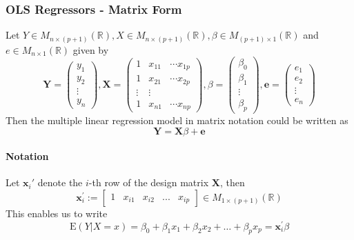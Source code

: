 \documentclass[10pt]{article}
\newcommand{\bx}{\mathbf{x}}
\newcommand{\R}{\mathbb{R}}
\newcommand{\mat}[2]{M_{#1 \times #2}(\R)}
\begin{document}
\subsubsection{OLS Regressors - Matrix Form}
Let $Y \in \mat{n}{(p+1)}, X\in \mat{n}{(p+1)}, \beta\in \mat{(p+1)}{1}$ and $e\in \mat{n}{1}$ given by
\begin{equation*}
    \mathbf{Y}=\left(\begin{array}{c}{y_{1}} \\ {y_{2}} \\ {\vdots} \\ {y_{n}}\end{array}\right), \mathbf{X}=\left(\begin{array}{ccc}{1} & {x_{11}} & {\cdots x_{1 p}} \\ {1} & {x_{21}} & {\cdots x_{2 p}} \\ {\vdots} & {\vdots} & {} \\ {1} & {x_{n 1}} & {\cdots x_{n p}}\end{array}\right), \beta=\left(\begin{array}{c}{\beta_{0}} \\ {\beta_{1}} \\ {\vdots} \\ {\beta_{p}}\end{array}\right), \mathbf{e}=\left(\begin{array}{c}{e_{1}} \\ {e_{2}} \\ {\vdots} \\ {e_{n}}\end{array}\right)
\end{equation*}
Then the multiple linear regression model in matrix notation could be written as
\begin{equation*}
    \mathbf{Y}=\mathbf{X} \beta+\mathbf{e}
\end{equation*}
\paragraph{Notation} Let $\bx_i'$ denote the $i$-th row of the design matrix $\mathbf{X}$, then
\begin{equation*}
    \mathbf{x}_{i}^{\prime}:=\begin{bmatrix}
        1 & x_{i1} & x_{i2} & ... & x_{ip} 
    \end{bmatrix} 
    \in \mat{1}{(p+1)}
\end{equation*}
This enables us to write 
\begin{equation*}
    \mathrm{E}(Y | X=x)=\beta_{0}+\beta_{1} x_{1}+\beta_{2} x_{2}+\ldots+\beta_{p} x_{p}=\mathbf{x}_{i}^{\prime} \beta
\end{equation*}
\end{document}
